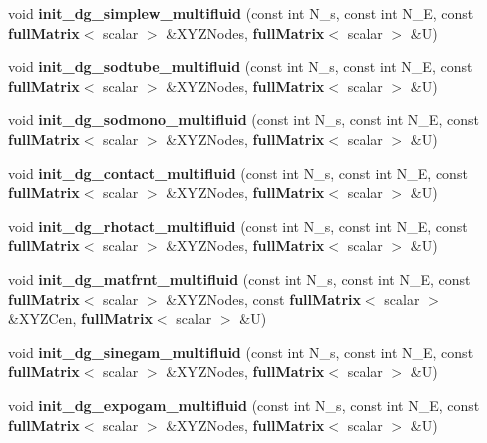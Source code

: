 \begin{DoxyCompactItemize}
\item 
void {\bfseries init\-\_\-dg\-\_\-simplew\-\_\-multifluid} (const int N\-\_\-s, const int N\-\_\-\-E, const {\bf full\-Matrix}$<$ scalar $>$ \&X\-Y\-Z\-Nodes, {\bf full\-Matrix}$<$ scalar $>$ \&U)\label{init__cond_8h_a09c88c3865d7af5c24b4fde30a2675ee}

\item 
void {\bfseries init\-\_\-dg\-\_\-sodtube\-\_\-multifluid} (const int N\-\_\-s, const int N\-\_\-\-E, const {\bf full\-Matrix}$<$ scalar $>$ \&X\-Y\-Z\-Nodes, {\bf full\-Matrix}$<$ scalar $>$ \&U)\label{init__cond_8h_a13f2401a9ad8ecadf104bb1979d6abb7}

\item 
void {\bfseries init\-\_\-dg\-\_\-sodmono\-\_\-multifluid} (const int N\-\_\-s, const int N\-\_\-\-E, const {\bf full\-Matrix}$<$ scalar $>$ \&X\-Y\-Z\-Nodes, {\bf full\-Matrix}$<$ scalar $>$ \&U)\label{init__cond_8h_aedd0a8830a24370417296a7cc268c626}

\item 
void {\bfseries init\-\_\-dg\-\_\-contact\-\_\-multifluid} (const int N\-\_\-s, const int N\-\_\-\-E, const {\bf full\-Matrix}$<$ scalar $>$ \&X\-Y\-Z\-Nodes, {\bf full\-Matrix}$<$ scalar $>$ \&U)\label{init__cond_8h_ab62ad158c606f821436b483b56c23d6a}

\item 
void {\bfseries init\-\_\-dg\-\_\-rhotact\-\_\-multifluid} (const int N\-\_\-s, const int N\-\_\-\-E, const {\bf full\-Matrix}$<$ scalar $>$ \&X\-Y\-Z\-Nodes, {\bf full\-Matrix}$<$ scalar $>$ \&U)\label{init__cond_8h_a3afd9ee6675095249e3d011aa306917f}

\item 
void {\bfseries init\-\_\-dg\-\_\-matfrnt\-\_\-multifluid} (const int N\-\_\-s, const int N\-\_\-\-E, const {\bf full\-Matrix}$<$ scalar $>$ \&X\-Y\-Z\-Nodes, const {\bf full\-Matrix}$<$ scalar $>$ \&X\-Y\-Z\-Cen, {\bf full\-Matrix}$<$ scalar $>$ \&U)\label{init__cond_8h_a35b48cc18f1bbb070aeefe7fdbdd6dd8}

\item 
void {\bfseries init\-\_\-dg\-\_\-sinegam\-\_\-multifluid} (const int N\-\_\-s, const int N\-\_\-\-E, const {\bf full\-Matrix}$<$ scalar $>$ \&X\-Y\-Z\-Nodes, {\bf full\-Matrix}$<$ scalar $>$ \&U)\label{init__cond_8h_a4d9a8eea46e0cf15246d2099dd0d6f23}

\item 
void {\bfseries init\-\_\-dg\-\_\-expogam\-\_\-multifluid} (const int N\-\_\-s, const int N\-\_\-\-E, const {\bf full\-Matrix}$<$ scalar $>$ \&X\-Y\-Z\-Nodes, {\bf full\-Matrix}$<$ scalar $>$ \&U)\label{init__cond_8h_a6818d28db7e076a0d50e1160595a4451}


\end{DoxyCompactItemize}
